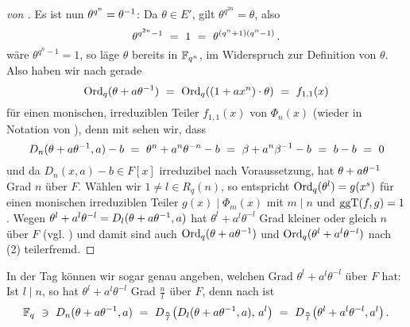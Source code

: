 \begin{proof}[von ]
  Es ist nun $\theta^{q^n} = \theta^{-1}$: 
  Da $\theta \in E'$, gilt $\theta^{q^{2n}} = \theta$, also
  \[ \theta^{q^{2n}-1} \ =\  1 \ =\  \theta^{(q^n+1)(q^n-1)}\,. \]
  wäre $\theta^{q^n-1} = 1$, so läge $\theta$ bereits in $\mathbb{F}_{q^n}$, im Widerspruch
  zur Definition von $\theta$.
  Also haben wir nach  
  gerade 
  \[ \operatorname{Ord}_q(\theta + a\theta^{-1}) \ =\ 
    \operatorname{Ord}_q((1+ax^n)\cdot \theta) \ =\  f_{1,1}(x)\]
  für einen monischen, irreduziblen Teiler $f_{1,1}(x)$ von $\Phi_n(x)$
  (wieder in Notation von ), denn
  mit  sehen wir, dass
  \[ D_n(\theta + a\theta^{-1},a) -b \ =\  \theta^n + a^n\theta^{-n} -b
    \ =\  \beta +a^n\beta^{-1} -b \ =\  b - b\ =\  0\]
  und da $D_n(x,a)-b \in F[x]$ irreduzibel nach Voraussetzung, hat
  $\theta + a\theta^{-1}$ Grad $n$ über $F$.
  Wählen wir $1 \neq l \in R_q(n)$, so entspricht 
  $\operatorname{Ord}_q(\theta^l) = g(x^s)$ für einen monischen irreduziblen Teiler 
  $g(x) \mid \Phi_m(x)$ mit $m\mid n$ und $\operatorname{ggT}(f,g) = 1$. 
  Wegen $\theta^l+a^l\theta^{-l} = D_l(\theta+a\theta^{-1},a)$ hat 
  $\theta^l+a^l\theta^{-l}$ Grad kleiner oder gleich $n$ über $F$ 
  (vgl. )
  und damit sind auch
  $\operatorname{Ord}_q(\theta+a\theta^{-1})$ und $\operatorname{Ord}_q(\theta^l+a^l\theta^{-l})$ 
  nach  (2) teilerfremd.
\end{proof}

\begin{bemerkung}
  \label{bem:grad_phi_l}
  In der Tag können wir sogar genau angeben, welchen Grad 
  $\theta^l+a^l\theta^{-l}$ über $F$ hat: Ist $l\mid n$, 
  so hat $\theta^l+a^l\theta^{-l}$ Grad $\tfrac n l$ über $F$, denn nach
   ist
  \[ \mathbb{F}_q\ \ni\ D_n(\theta + a \theta^{-1}, a) \ =\  
    D_{\frac n l}\big( D_l(\theta+a\theta^{-1},a),\, a^l\big) \ =\ 
    D_{\frac n l}\big(\theta^l + a^l \theta^{-l}, a^l\big)\,.\]
 \TODO
\end{bemerkung}


